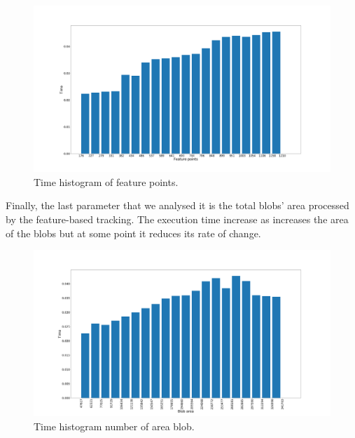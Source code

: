 \begin{figure}[H]
\centering         
\includegraphics[width=14cm]{jder/featruePoints.png}
\caption{Time histogram of feature points.} \label{timing4}
\end{figure}

Finally, the last parameter that we analysed it is the total blobs' area processed by the feature-based tracking. The execution time increase as increases the area of the blobs but at some point it reduces its rate of change.

\begin{figure}[H]
\centering         
\includegraphics[width=14cm]{jder/blobArea.png}
\caption{Time histogram number of area blob.} \label{timing5}
\end{figure}




